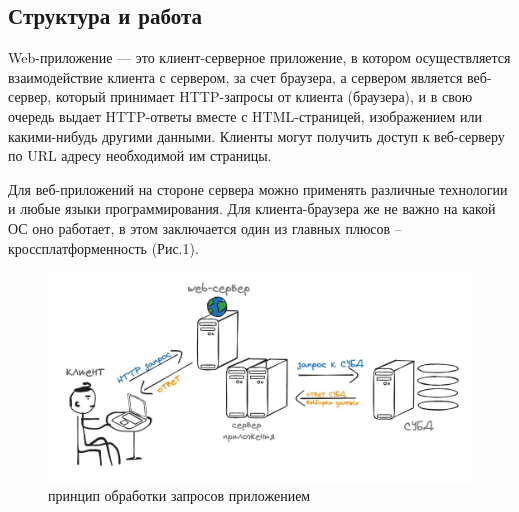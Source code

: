 \subsection{Структура и работа}
Web-приложение — это клиент-серверное приложение, в котором осуществляется взаимодействие клиента с сервером, за 
счет браузера, а сервером является веб-сервер, который принимает HTTP-запросы от клиента (браузера), и в свою очередь 
выдает HTTP-ответы вместе с HTML-страницей, изображением или какими-нибудь другими данными. Клиенты могут получить доступ
к веб-серверу по URL адресу необходимой им страницы.

Для веб-приложений на стороне сервера можно применять различные технологии и любые языки программирования. 
Для клиента-браузера же не важно на какой ОС оно работает, в этом заключается один из главных плюсов --
кроссплатформенность (Рис.1).
\begin{figure}[H]
  \centering
  \includegraphics[width=1\textwidth]{pict/1}
  \caption{принцип обработки запросов приложением}
  \label{fig:1}
\end{figure}

